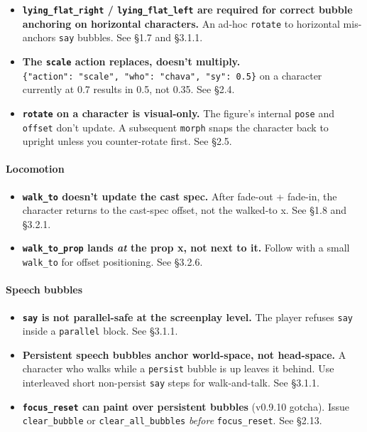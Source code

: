 \documentclass[
  12pt,
  letterpaper,
]{book}
\providecommand{\tightlist}{%
  \setlength{\itemsep}{0pt}\setlength{\parskip}{0pt}}
\begin{document}
\begin{itemize}
\tightlist
\item
  \textbf{\texttt{lying\_flat\_right} / \texttt{lying\_flat\_left} are
  required for correct bubble anchoring on horizontal characters.} An
  ad-hoc \texttt{rotate} to horizontal mis-anchors \texttt{say} bubbles.
  See §1.7 and §3.1.1.
\item
  \textbf{The \texttt{scale} action replaces, doesn't multiply.}
  \texttt{\{"action":\ "scale",\ "who":\ "chava",\ "sy":\ 0.5\}} on a
  character currently at 0.7 results in 0.5, not 0.35. See §2.4.
\item
  \textbf{\texttt{rotate} on a character is visual-only.} The figure's
  internal \texttt{pose} and \texttt{offset} don't update. A subsequent
  \texttt{morph} snaps the character back to upright unless you
  counter-rotate first. See §2.5.
\end{itemize}

\paragraph{Locomotion}\label{locomotion}

\begin{itemize}
\tightlist
\item
  \textbf{\texttt{walk\_to} doesn't update the cast spec.} After
  fade-out + fade-in, the character returns to the cast-spec offset, not
  the walked-to x. See §1.8 and §3.2.1.
\item
  \textbf{\texttt{walk\_to\_prop} lands \emph{at} the prop x, not next
  to it.} Follow with a small \texttt{walk\_to} for offset positioning.
  See §3.2.6.
\end{itemize}

\paragraph{Speech bubbles}\label{speech-bubbles}

\begin{itemize}
\tightlist
\item
  \textbf{\texttt{say} is not parallel-safe at the screenplay level.}
  The player refuses \texttt{say} inside a \texttt{parallel} block. See
  §3.1.1.
\item
  \textbf{Persistent speech bubbles anchor world-space, not head-space.}
  A character who walks while a \texttt{persist} bubble is up leaves it
  behind. Use interleaved short non-persist \texttt{say} steps for
  walk-and-talk. See §3.1.1.
\item
  \textbf{\texttt{focus\_reset} can paint over persistent bubbles}
  (v0.9.10 gotcha). Issue \texttt{clear\_bubble} or
  \texttt{clear\_all\_bubbles} \emph{before} \texttt{focus\_reset}. See
  §2.13.
\end{itemize}
\end{document}

